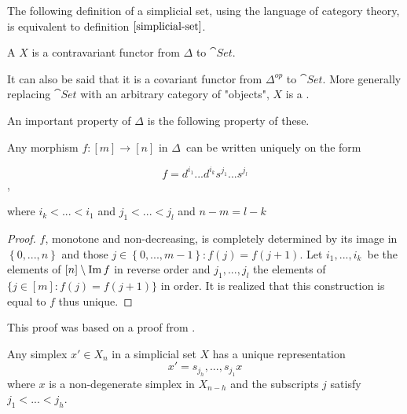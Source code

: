 \documentclass[../../main.tex]{subfiles}
\begin{document}
    The following definition of a simplicial set, using the language of category theory, is equivalent to definition $\ref{simplicial-set}$.

    \begin{definition}
        A  $X$ is a contravariant functor from $\Delta$ to $\cat{Set}$.
    \end{definition}

    It can also be said that it is a covariant functor from $\Delta^{op}$ to $\cat{Set}$. More generally replacing $\cat{Set}$ with an arbitrary category of "objects", $X$ is a . 
    
    An important property of $\Delta$ is the following property of these.

    \begin{proposition}\label{uni-fun}
        Any morphism $f: [m] \to [n]$ in $\Delta$ can be written uniquely on the form

        \begin{equation*}
            f = d^{i_1}...d^{i_k}s^{j_1}...s^{j_l}
        \end{equation*},

        where $i_k < ... < i_1$ and $j_1 < ... < j_l$ and $n - m = l - k$
    \end{proposition}

    \begin{proof}
        $f$, monotone and non-decreasing, is completely determined by its image in $\left\{ 0,...,n \right\}$ and those $j\in \left\{0,...,m-1 \right\}:f(j) = f(j+1)$. Let $i_1, ..., i_k$ be the elements of $[n] \setminus \operatorname{Im} f$ in reverse order and $j_1, ..., j_l$ the elements of $\{j \in [m]: f(j) = f(j+1)\}$ in order. It is realized that this construction is equal to $f$ thus unique.
    \end{proof}

    This proof was based on a proof from \cite{simp-maye}.

    \begin{corollary}\label{uni-sim}
        Any simplex $x' \in X_n$ in a simplicial set $X$ has a unique representation
        \[x' = s_{j_h},...,s_{j_1}x\]
        where $x$ is a non-degenerate simplex in $X_{n-h}$ and the subscripts $j$ satisfy $j_1 < ... < j_h$.
    \end{corollary}
    
\end{document}
